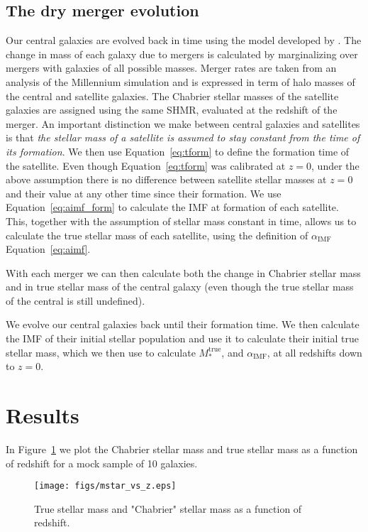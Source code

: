 \documentclass{emulateapj}
\def\mtrue{M_*^{\mathrm{true}}}
\def\aimf{\alpha_{\mathrm{IMF}}}
\def\Fref#1{Figure~\ref{#1}\xspace}
\def\Eref#1{Equation~\ref{#1}\xspace}
\begin{document}
\subsection{The dry merger evolution}

Our central galaxies are evolved back in time using the model developed by \citet{Nip++12}.
The change in mass of each galaxy due to mergers is calculated by marginalizing over mergers with galaxies of all possible masses.
Merger rates are taken from an analysis of the Millennium simulation and is expressed in term of halo masses of the central and satellite galaxies.
The Chabrier stellar masses of the satellite galaxies are assigned using the same SHMR, evaluated at the redshift of the merger.
An important distinction we make between central galaxies and satellites is that {\em the stellar mass of a satellite is assumed to stay constant from the time of its formation}.
We then use \Eref{eq:tform} to define the formation time of the satellite. Even though \Eref{eq:tform} was calibrated at $z=0$, under the above assumption there is no difference between satellite stellar masses at $z=0$ and their value at any other time since their formation.
We use \Eref{eq:aimf_form} to calculate the IMF at formation of each satellite.
This, together with the assumption of stellar mass constant in time, allows us to calculate the true stellar mass of each satellite, using the definition of $\aimf$ \Eref{eq:aimf}.

With each merger we can then calculate both the change in Chabrier stellar mass and in true stellar mass of the central galaxy (even though the true stellar mass of the central is still undefined).

We evolve our central galaxies back until their formation time.
We then calculate the IMF of their initial stellar population and use it to calculate their initial true stellar mass, which we then use to calculate $\mtrue$, and $\aimf$, at all redshifts down to $z=0$.


\section{Results}\label{sect:results}

In \Fref{fig:mstarz} we plot the Chabrier stellar mass and true stellar mass as a function of redshift for a mock sample of 10 galaxies.

\begin{figure}
\texttt{[image: figs/mstar\_vs\_z.eps]}
\caption{\label{fig:mstarz} 
 True stellar mass and "Chabrier" stellar mass as a function of redshift.}
\end{figure}
\end{document}
